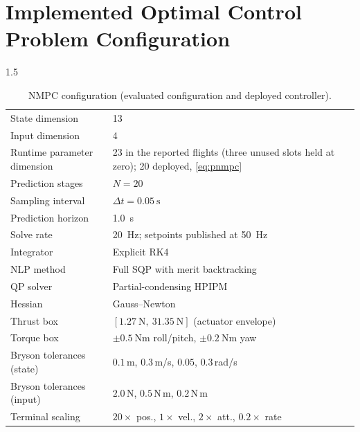 \begin{appendices}
\label{cha:appendices}

\chapter{Implemented Optimal Control Problem Configuration}

\begin{spacing}{1.5}

\begin{table}[ht]
\centering
\caption{NMPC configuration (evaluated configuration and deployed controller).}
\begin{tabular}{@{}l p{}@{}}
\toprule
State dimension & 13 \\
Input dimension & 4 \\
Runtime parameter dimension & 23 in the reported flights (three unused slots held at zero); 20 deployed, \eqref{eq:pnmpc} \\
Prediction stages & $N=20$ \\
Sampling interval & $\Delta t=\SI{0.05}{\second}$ \\
Prediction horizon & \SI{1.0}{\second} \\
Solve rate & \SI{20}{\hertz}; setpoints published at \SI{50}{\hertz} \\
Integrator & Explicit RK4 \\
NLP method & Full SQP with merit backtracking \\
QP solver & Partial-condensing HPIPM \\
Hessian & Gauss--Newton \\
Thrust box & $[\SI{1.27}{\newton},\ \SI{31.35}{\newton}]$ (actuator envelope) \\
Torque box & $\pm\SI{0.5}{\newton\meter}$ roll/pitch, $\pm\SI{0.2}{\newton\meter}$ yaw \\
Bryson tolerances (state) & $0.1$\,m, $0.3$\,m/s, $0.05$, $0.3$\,rad/s \\
Bryson tolerances (input) & $2.0$\,N, $0.5$\,N\,m, $0.2$\,N\,m \\
Terminal scaling & $20\times$ pos., $1\times$ vel., $2\times$ att., $0.2\times$ rate \\
\bottomrule
\end{tabular}
\end{table}


\end{spacing}
\end{appendices}
